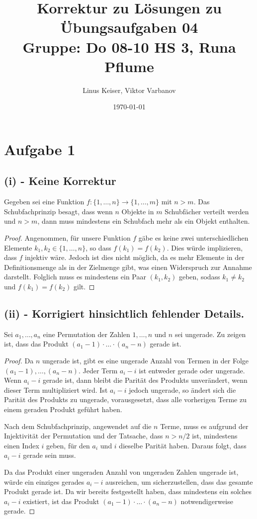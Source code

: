 \documentclass{article}
\title{Korrektur zu Lösungen zu Übungsaufgaben 04 \\ \small Gruppe: Do 08-10 HS 3, Runa Pflume}
\author{Linus Keiser, Viktor Varbanov}
\date{\today}
\begin{document}
\maketitle

\section*{Aufgabe 1}

\subsection*{(i) - Keine Korrektur}
Gegeben sei eine Funktion $f: \{1, \ldots, n\} \rightarrow \{1, \ldots, m\}$ mit $n > m$. Das Schubfachprinzip besagt, dass wenn $n$ Objekte in $m$ Schubfächer verteilt werden und $n > m$, dann muss mindestens ein Schubfach mehr als ein Objekt enthalten.

\begin{proof}
	Angenommen, für unsere Funktion $f$ gäbe es keine zwei unterschiedlichen Elemente $k_1, k_2 \in \{1, \ldots, n\}$, so dass $f(k_1) = f(k_2)$. Dies würde implizieren, dass $f$ injektiv wäre. Jedoch ist dies nicht möglich, da es mehr Elemente in der Definitionsmenge als in der Zielmenge gibt, was einen Widerspruch zur Annahme darstellt. Folglich muss es mindestens ein Paar $(k_1, k_2)$ geben, sodass $k_1 \neq k_2$ und $f(k_1) = f(k_2)$ gilt.
\end{proof}

\subsection*{(ii) - Korrigiert hinsichtlich fehlender Details.}
Sei \(a_1, \ldots, a_n\) eine Permutation der Zahlen \(1, \ldots, n\) und \(n\) sei ungerade. Zu zeigen ist, dass das Produkt \((a_1 - 1) \cdot \ldots \cdot (a_n - n)\) gerade ist.

\begin{proof}
	Da \(n\) ungerade ist, gibt es eine ungerade Anzahl von Termen in der Folge \((a_1 - 1), \ldots, (a_n - n)\). Jeder Term \(a_i - i\) ist entweder gerade oder ungerade. Wenn \(a_i - i\) gerade ist, dann bleibt die Parität des Produkts unverändert, wenn dieser Term multipliziert wird. Ist \(a_i - i\) jedoch ungerade, so ändert sich die Parität des Produkts zu ungerade, vorausgesetzt, dass alle vorherigen Terme zu einem geraden Produkt geführt haben.

	Nach dem Schubfachprinzip, angewendet auf die \(n\) Terme, muss es aufgrund der Injektivität der Permutation und der Tatsache, dass \(n > n/2\) ist, mindestens einen Index \(i\) geben, für den \(a_i\) und \(i\) dieselbe Parität haben. Daraus folgt, dass \(a_i - i\) gerade sein muss.

	Da das Produkt einer ungeraden Anzahl von ungeraden Zahlen ungerade ist, würde ein einziges gerades \(a_i - i\) ausreichen, um sicherzustellen, dass das gesamte Produkt gerade ist. Da wir bereits festgestellt haben, dass mindestens ein solches \(a_i - i\) existiert, ist das Produkt \((a_1 - 1) \cdot \ldots \cdot (a_n - n)\) notwendigerweise gerade.
\end{proof}
\end{document}
